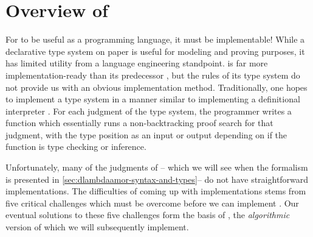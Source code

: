 \section{Overview of \bilambdaamor}
\label{sec:bilambdaamor-overview}
For \dlambdaamor to be useful as a programming language, it must be implementable! While a declarative type system on paper is useful for modeling and proving purposes, it has limited utility from a language engineering standpoint. \dlambdaamor is far more implementation-ready than its predecessor \lambdaamor, but the rules of its type system do not provide us with an obvious implementation method. Traditionally, one hopes to implement a type system in a manner similar to implementing a definitional interpreter \cite{reynolds:acm72}. For each judgment of the type system, the programmer writes a function which essentially runs a non-backtracking proof search for that judgment, with the type position as an input or output depending on if the function is type checking or inference.

Unfortunately, many of the judgments of \dlambdaamor -- which we will see when the formalism is presented in \autoref{sec:dlambdaamor-syntax-and-types}-- do not have straightforward implementations. The difficulties of coming up with implementations stems from five critical challenges which must be overcome before we can implement \dlambdaamor. Our eventual solutions to these five challenges form the basis of \bilambdaamor, the \textit{algorithmic} version of \dlambdaamor which we will subsequently implement.

